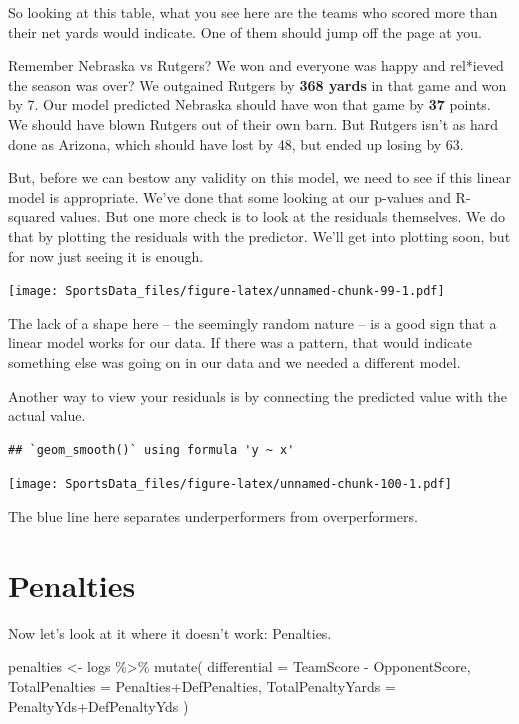 \documentclass[
]{book}
\newenvironment{Shaded}{\begin{snugshade}}{\end{snugshade}}
\newcommand{\AttributeTok}[1]{\textcolor[rgb]{0.77,0.63,0.00}{#1}}
\newcommand{\FunctionTok}[1]{\textcolor[rgb]{0.00,0.00,0.00}{#1}}
\newcommand{\NormalTok}[1]{#1}
\newcommand{\OtherTok}[1]{\textcolor[rgb]{0.56,0.35,0.01}{#1}}
\newcommand{\SpecialCharTok}[1]{\textcolor[rgb]{0.00,0.00,0.00}{#1}}
\begin{document}
So looking at this table, what you see here are the teams who scored more than their net yards would indicate. One of them should jump off the page at you.

Remember Nebraska vs Rutgers? We won and everyone was happy and rel*ieved the season was over? We outgained Rutgers by \textbf{368 yards} in that game and won by 7. Our model predicted Nebraska should have won that game by \textbf{37} points. We should have blown Rutgers out of their own barn. But Rutgers isn't as hard done as Arizona, which should have lost by 48, but ended up losing by 63.

But, before we can bestow any validity on this model, we need to see if this linear model is appropriate. We've done that some looking at our p-values and R-squared values. But one more check is to look at the residuals themselves. We do that by plotting the residuals with the predictor. We'll get into plotting soon, but for now just seeing it is enough.

\texttt{[image: SportsData\_files/figure-latex/unnamed-chunk-99-1.pdf]}

The lack of a shape here -- the seemingly random nature -- is a good sign that a linear model works for our data. If there was a pattern, that would indicate something else was going on in our data and we needed a different model.

Another way to view your residuals is by connecting the predicted value with the actual value.

\begin{verbatim}
## `geom_smooth()` using formula 'y ~ x'
\end{verbatim}

\texttt{[image: SportsData\_files/figure-latex/unnamed-chunk-100-1.pdf]}

The blue line here separates underperformers from overperformers.

\hypertarget{penalties}{%
\section{Penalties}\label{penalties}}

Now let's look at it where it doesn't work: Penalties.

\begin{Shaded}
\begin{Highlighting}[]
\NormalTok{penalties }\OtherTok{\textless{}{-}}\NormalTok{ logs }\SpecialCharTok{\%\textgreater{}\%} 
  \FunctionTok{mutate}\NormalTok{(}
    \AttributeTok{differential =}\NormalTok{ TeamScore }\SpecialCharTok{{-}}\NormalTok{ OpponentScore, }
    \AttributeTok{TotalPenalties =}\NormalTok{ Penalties}\SpecialCharTok{+}\NormalTok{DefPenalties,}
    \AttributeTok{TotalPenaltyYards =}\NormalTok{ PenaltyYds}\SpecialCharTok{+}\NormalTok{DefPenaltyYds}
\NormalTok{  )}
\end{Highlighting}
\end{Shaded}
\end{document}
